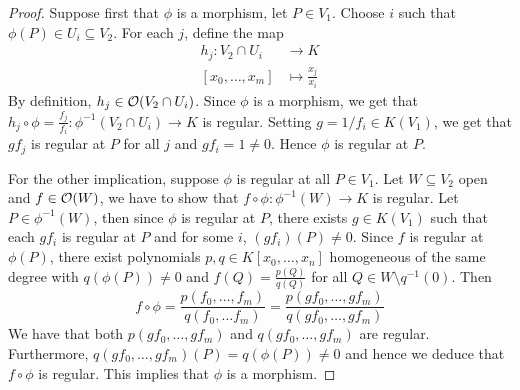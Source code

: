 \begin{proof}
	Suppose first that $\phi$ is a morphism, let $P \in V_1$.
	Choose $i$ such that $\phi(P) \in U_i \subseteq V_2$.
	For each $j$, define the map
	\begin{align*}
		h_j: V_2\cap U_i &\to K\\
		[x_0, \dots, x_m] &\mapsto \frac{x_j}{x_i}
	\end{align*}
	By definition, $h_j \in \mathcal{O}(V_2\cap U_i)$.
	Since $\phi$ is a morphism, we get that
	$h_j \circ \phi = \frac{f_j}{f_i}: \phi^{-1}(V_2\cap U_i) \to K$ is regular.
	Setting $g = 1/f_i \in K(V_1)$, we get that
	$gf_j$ is regular at $P$ for all $j$ and $gf_i = 1 \neq 0$.
	Hence $\phi$ is regular at $P$.

	For the other implication, suppose $\phi$ is regular at all $P \in V_1$.
	Let $W \subseteq V_2$ open and $f \in \mathcal{O}(W)$, we have to show that
	$f\circ\phi: \phi^{-1}(W) \to K$ is regular.
	Let $P \in \phi^{-1}(W)$, then since $\phi$ is regular at $P$,
	there exists $g \in K(V_1)$ such that each $gf_i$ is regular at $P$
	and for some $i$, $(gf_i)(P) \neq 0$.
	Since $f$ is regular at $\phi(P)$, there exist polynomials
	$p, q \in K[x_0, \dots, x_n]$ homogeneous of the same degree
	with $q(\phi(P)) \neq 0$ and 
	$f(Q) = \frac{p(Q)}{q(Q)}$ for all $Q \in W\setminus q^{-1}(0)$. Then
	\begin{equation*}
		f \circ \phi = \frac{p(f_0, \dots, f_m)}{q(f_0, \dots f_m)}
		= \frac{p(gf_0, \dots, gf_m)}{q(gf_0, \dots, gf_m)}
	\end{equation*}
	We have that both $p(gf_0, \dots, gf_m)$ and $q(gf_0, \dots, gf_m)$ are
	regular. Furthermore, $q(gf_0, \dots, gf_m)(P) = q(\phi(P)) \neq 0$
	and hence we deduce that $f\circ \phi$ is regular.
	This implies that $\phi$ is a morphism.
\end{proof}
